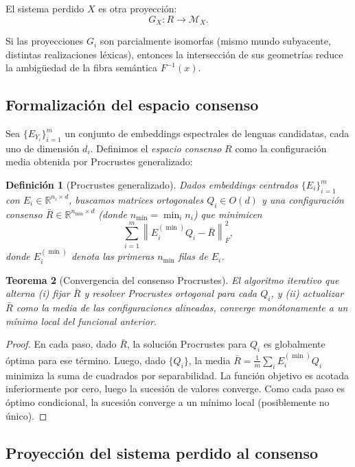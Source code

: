 \documentclass[11pt,a4paper]{article}
\newtheorem{theorem}{Teorema}[section]
\newtheorem{definition}[theorem]{Definición}
\newcommand{\R}{\mathbb{R}}
\newcommand{\1}{\mathbf{1}}
\newcommand{\norm}[1]{\left\lVert #1 \right\rVert}
\numberwithin{equation}{section}
\begin{document}
El sistema perdido $X$ es otra proyección:
\[
    G_X: R \to \mathcal{M}_X.
\]

Si las proyecciones $G_i$ son parcialmente isomorfas (mismo mundo subyacente, distintas realizaciones léxicas), entonces la intersección de sus geometrías reduce la ambigüedad de la fibra semántica $F^{-1}(x)$.

\subsection{Formalización del espacio consenso}

Sea $\{E_{Y_i}\}_{i=1}^m$ un conjunto de embeddings espectrales de lenguas candidatas, cada uno de dimensión $d_i$. Definimos el \emph{espacio consenso} $R$ como la configuración media obtenida por Procrustes generalizado:

\begin{definition}[Procrustes generalizado]
Dados embeddings centrados $\{E_i\}_{i=1}^m$ con $E_i\in\R^{n_i\times d}$, buscamos matrices ortogonales $Q_i\in O(d)$ y una configuración consenso $\bar{R}\in\R^{n_{\min}\times d}$ (donde $n_{\min}=\min_i n_i$) que minimicen
\begin{equation}
    \sum_{i=1}^m \norm{E_i^{(\min)} Q_i - \bar{R}}_F^2,
\end{equation}
donde $E_i^{(\min)}$ denota las primeras $n_{\min}$ filas de $E_i$.
\end{definition}

\begin{theorem}[Convergencia del consenso Procrustes]
El algoritmo iterativo que alterna (i) fijar $\bar{R}$ y resolver Procrustes ortogonal para cada $Q_i$, y (ii) actualizar $\bar{R}$ como la media de las configuraciones alineadas, converge monótonamente a un mínimo local del funcional anterior.
\end{theorem}

\begin{proof}
En cada paso, dado $\bar{R}$, la solución Procrustes para $Q_i$ es globalmente óptima para ese término. Luego, dado $\{Q_i\}$, la media $\bar{R}=\frac{1}{m}\sum_i E_i^{(\min)}Q_i$ minimiza la suma de cuadrados por separabilidad. La función objetivo es acotada inferiormente por cero, luego la sucesión de valores converge. Como cada paso es óptimo condicional, la sucesión converge a un mínimo local (posiblemente no único).
\end{proof}

\subsection{Proyección del sistema perdido al consenso}
\end{document}
